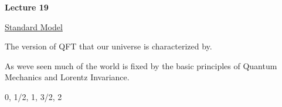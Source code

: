 
\usepackage{braket}
\usepackage{bbm}
\usepackage{relsize}
\usepackage{tcolorbox}



\usepackage{cancel}

\usepackage{fancyhdr}

\fancyhf{}


\thispagestyle{fancy}

\begin{center}
{\huge \textbf{Lecture 19}}
\end{center}

{\fontsize{14}{16}\selectfont

\underline{Standard Model}

The version of QFT that our universe is characterized by.

As weve seen much of the world is fixed by the basic principles of Quantum Mechanics and Lorentz Invariance.

\begin{center}
0, 1/2, 1, 3/2, 2  
\end{center}

}

